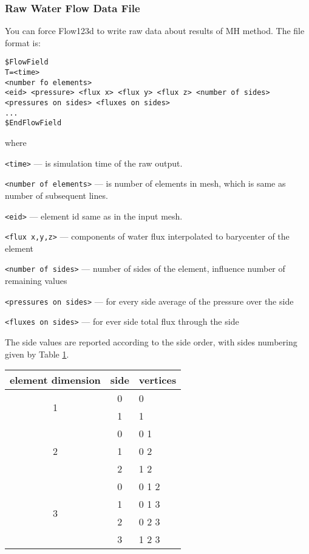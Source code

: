 \subsubsection{Raw Water Flow Data File}
You can force Flow123d to write raw data about results of MH method. The file format is:
\begin{verbatim}
$FlowField
T=<time>
<number fo elements>
<eid> <pressure> <flux x> <flux y> <flux z> <number of sides> <pressures on sides> <fluxes on sides> 
...
$EndFlowField
\end{verbatim}

where 
\begin{description}
 \item \verb'<time>' --- is simulation time of the raw output.
 \item \verb'<number of elements>' --- is number of elements in mesh, which is same as number of subsequent lines.
 \item \verb'<eid>' --- element id same as in the input mesh.
 \item \verb'<flux x,y,z>' --- components of water flux interpolated to barycenter of the element
 \item \verb'<number of sides>' --- number of sides of the element, influence number of remaining values
 \item \verb'<pressures on sides>' --- for every side average of the pressure over the side
 \item \verb'<fluxes on sides>' --- for ever side total flux through the side 
\end{description}

The side values are reported according to the side order, with sides numbering given by Table \ref{tab:side_numbers}.
\begin{table}[h]
    \label{tab:side_numbers}
    \begin{tabular}{ccl}
        \toprule
        element dimension   &   side       &   vertices \\
        \toprule
        \multirow{2}{*}{1}  &   0          &   0  \\
                            &   1          &   1  \\
        \midrule
        \multirow{3}{*}{2}  &   0          &   0 1  \\
                            &   1          &   0 2  \\
                            &   2          &   1 2  \\    
        \midrule
        \multirow{4}{*}{3}  &   0          &   0 1 2 \\
                            &   1          &   0 1 3 \\
                            &   2          &   0 2 3 \\
                            &   3          &   1 2 3 \\    
        \bottomrule
    \end{tabular}    
\end{table}

